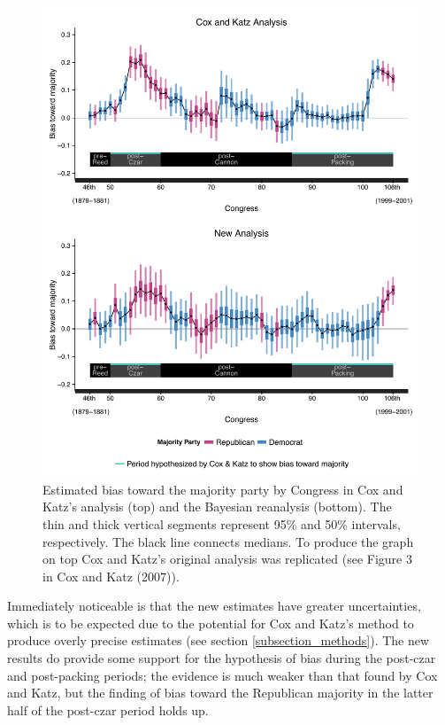 \begin{figure}
\centering
\includegraphics[scale=0.75]{sections/figs/ck_replication_new}
\caption{Estimated bias toward the majority party by Congress in 
Cox and Katz's analysis (top) and the Bayesian reanalysis (bottom). 
The thin and thick vertical segments represent 95\%  and 50\%
intervals, respectively.  The black line connects medians.
To produce the graph on top Cox and Katz's original analysis was 
replicated (see Figure 3 in Cox and Katz (2007)).}
\label{fig:ck_bias}
\end{figure}

Immediately noticeable is that the new estimates have greater 
uncertainties, which is to be expected due to the potential for Cox and Katz's method to 
produce overly precise estimates  (see section \ref{subsection_methods}). The new results 
do provide some support for the hypothesis of bias during the post-czar and post-packing 
periods; the evidence is much weaker than that found by Cox and Katz, but the finding 
of bias toward the Republican majority in the latter half of the post-czar period holds up. 

